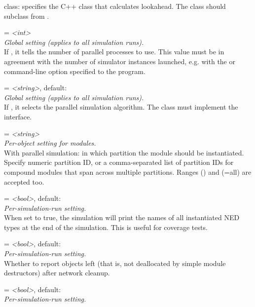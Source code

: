 \begin{description}
    class: specifies the C++ class that calculates lookahead. The class should
    subclass from .
\item[parsim-num-partitions] = \textit{<int>}\\
    \textit{Global setting (applies to all simulation runs).}\\
    If , it tells the
    number of parallel processes to use. This value must be in agreement with
    the number of simulator instances launched, e.g. with the
     or  command-line option
    specified to the  program.
\item[parsim-synchronization-class] = \textit{<string>}, default: \\
    \textit{Global setting (applies to all simulation runs).}\\
    If , it selects the
    parallel simulation algorithm. The class must implement the
     interface.
\item[**.partition-id] = \textit{<string>}\\
    \textit{Per-object setting for modules.}\\
    With parallel simulation: in which partition the module should be
    instantiated. Specify numeric partition ID, or a comma-separated list of
    partition IDs for compound modules that span across multiple partitions.
    Ranges () and \ttt{*} (=all) are accepted too.
\item[print-instantiated-ned-types] = \textit{<bool>}, default: \\
    \textit{Per-simulation-run setting.}\\
    When set to true, the simulation will print the names of all instantiated
    NED types at the end of the simulation. This is useful for coverage tests.
\item[print-undisposed] = \textit{<bool>}, default: \\
    \textit{Per-simulation-run setting.}\\
    Whether to report objects left (that is, not deallocated by simple module
    destructors) after network cleanup.
\item[print-unused-parameters] = \textit{<bool>}, default: \\
    \textit{Per-simulation-run setting.}\\

\end{description}
